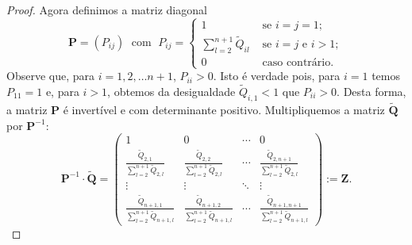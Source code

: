 \documentclass[twoside,openright,titlepage,numbers=noenddot,headinclude,  lineheaders footinclude=true,cleardoublepage=empty,
                                BCOR=5mm,paper=a4,fontsize=12pt ]{scrbook}
\theoremstyle{definition}
\begin{document}
\begin{proof}
Agora definimos a matriz diagonal
\[
\mathbf{P} = (P_{ij}) \; \text{ com } \;
P_{ij} = 
\begin{cases}
1 & \text{ se } i = j = 1;\\
 \sum_{l = 2}^{n+1} \widetilde{Q}_{il} & \text{ se } i = j
\text{ e } i > 1 ;\\
0 & \text{ caso contrário}.
\end{cases}
\]
Observe que, para $i = 1, 2, \ldots n+1$, $P_{ii} > 0$. Isto é 
verdade
pois, para $i = 1$ temos $P_{11} = 1$ e, para $i > 1$,
obtemos da desigualdade $\widetilde{Q}_{i,1} < 1$ que $P_{ii} > 0$.
Desta forma, a matriz $\mathbf{P}$ é invertível e com determinante
positivo.
Multipliquemos a matriz $\mathbf{\widetilde{Q}}$
por $\mathbf{P}^{-1}$:
\[
\mathbf{P}^{-1} \cdot \mathbf{\widetilde{Q}} = 
\begin{pmatrix}
1 & 0 & \cdots & 0\\
\frac{\widetilde{Q}_{2,1}}{\sum_{l = 2}^{n+1} \widetilde{Q}_{2,l}}
&
\frac{\widetilde{Q}_{2,2}}{\sum_{l = 2}^{n+1} \widetilde{Q}_{2,l}}
& \cdots &
\frac{\widetilde{Q}_{2,n+1}}
{\sum_{l = 2}^{n+1} \widetilde{Q}_{2,l}}
\\
\vdots & \vdots & \ddots & \vdots\\
\frac{\widetilde{Q}_{n+1,1}}
{\sum_{l = 2}^{n+1} \widetilde{Q}_{n+1,l}}
&
\frac{\widetilde{Q}_{n+1,2}}
{\sum_{l = 2}^{n+1} \widetilde{Q}_{n+1,l}}
& \cdots &
\frac{\widetilde{Q}_{n+1,n+1}}
{\sum_{l = 2}^{n+1} \widetilde{Q}_{n+1,l}}
\end{pmatrix}
:= \mathbf{Z}.
\]


\end{proof}
\end{document}
